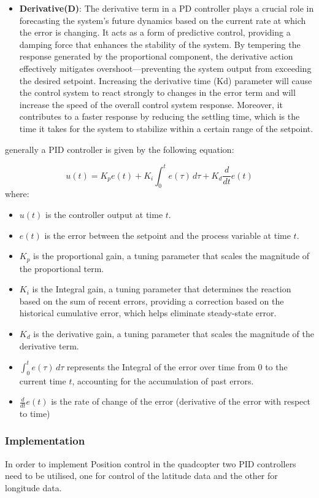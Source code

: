 \documentclass{article}
\begin{document}
\begin{itemize}
  \item \textbf{Derivative(D)}: The derivative term in a PD controller plays a crucial role in forecasting the system's future dynamics based on the current rate at which the error is changing. It acts as a form of predictive control, providing a damping force that enhances the stability of the system. 
  By tempering the response generated by the proportional component, the derivative action effectively mitigates overshoot—preventing the system output from exceeding the desired setpoint. Increasing the derivative time (Kd) parameter will cause the control system to react strongly to changes in the 
  error term and will increase the speed of the overall control system response. Moreover, it contributes to a faster response by reducing the settling time, which is the time it takes for the system to stabilize within a certain range of the setpoint.
\end{itemize}
generally a PID controller is given by the following equation: 

\begin{equation}
  u(t) = K_p e(t) + K_i \int_{0}^{t} e(\tau) \, d\tau + K_d \frac{d}{dt} e(t)
\end{equation}
where:
\begin{itemize}
    \item $u(t)$ is the controller output at time $t$.
    \item $e(t)$ is the error between the setpoint and the process variable at time $t$.
    \item $K_p$ is the proportional gain, a tuning parameter that scales the magnitude of the proportional term.
    \item $K_i$ is the Integral gain, a tuning parameter that determines the reaction based on the sum of recent errors, providing a correction based on the historical cumulative error, which helps eliminate steady-state error.
    \item $K_d$ is the derivative gain, a tuning parameter that scales the magnitude of the derivative term.
    \item $\int_{0}^{t} e(\tau) \, d\tau$ represents the Integral of the error over time from 0 to the current time $t$, accounting for the accumulation of past errors.
    \item $\frac{d}{dt} e(t)$ is the rate of change of the error (derivative of the error with respect to time)
\end{itemize}
\subsubsection*{Implementation}
In order to implement Position control in the quadcopter two PID controllers need to be utilised, one for control of the latitude data and the other for longitude data. 
\end{document}
